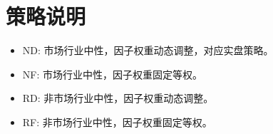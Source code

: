 \section{策略说明}

\begin{itemize}
    \item ND: 市场行业中性，因子权重动态调整，对应实盘策略。
    \item NF: 市场行业中性，因子权重固定等权。
    \item RD: 非市场行业中性，因子权重动态调整。
    \item RF: 非市场行业中性，因子权重固定等权。
\end{itemize}